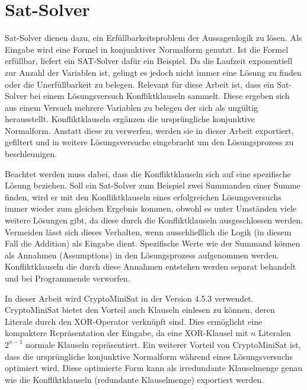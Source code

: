 \section{Sat-Solver}
\label{sec:satsolver}

Sat-Solver dienen dazu, ein Erfüllbarkeitsproblem der Aussagenlogik zu lösen. Als Eingabe wird eine Formel in konjunktiver Normalform genutzt.
Ist die Formel erfüllbar, liefert ein SAT-Solver dafür ein Beispiel. Da die Laufzeit exponentiell zur Anzahl der Variablen ist, gelingt
es jedoch nicht immer eine Lösung zu finden oder die Unerfüllbarkeit zu belegen. Relevant für diese Arbeit ist, dass ein Sat-Solver bei einem
Lösungsversuch Konfliktklauseln sammelt. Diese ergeben sich aus einem Versuch mehrere Variablen zu belegen der sich als ungültig herausstellt.
Konfliktklauseln ergänzen die ursprüngliche konjunktive Normalform. Anstatt diese zu verwerfen, werden sie in dieser Arbeit exportiert, gefiltert
und in weitere Lösungsversuche eingebracht um den Lösungsprozess zu beschleunigen.

Beachtet werden muss dabei, dass die Konfliktklauseln sich auf eine spezifische Lösung beziehen. Soll ein Sat-Solver zum Beispiel zwei Summanden
einer Summe finden, wird er mit den Konfliktklauseln eines erfolgreichen Lösungsversuchs immer wieder zum gleichen Ergebnis kommen, obwohl es
unter Umständen viele weitere Lösungen gibt, da diese durch die Konfliktklauseln ausgeschlossen werden. Vermeiden lässt sich dieses Verhalten,
wenn ausschließlich die Logik (in diesem Fall die Addition) als Eingabe dient. Spezifische Werte wie der Summand können als Annahmen (Assumptions)
in den Lösungsprozess aufgenommen werden. Konfliktklauseln die durch diese Annahmen entstehen werden separat behandelt und bei Programmende verworfen.

In dieser Arbeit wird CryptoMiniSat in der Version 4.5.3 verwendet. CryptoMiniSat bietet den Vorteil auch Klauseln einlesen zu können, deren Literale
durch den XOR-Operator verknüpft sind. Dies ermöglicht eine kompaktere Repräsentation der Eingabe, da eine XOR-Klausel mit $n$ Literalen $2^{n-1}$
normale Klauseln repräsentiert. Ein weiterer Vorteil von CryptoMiniSat ist, dass die ursprüngliche konjunktive Normalform während eines Lösungsversuchs
optimiert wird. Diese optimierte Form kann als irredundante Klauselmenge genau wie die Konfliktklauseln (redundante Klauselmenge) exportiert werden.